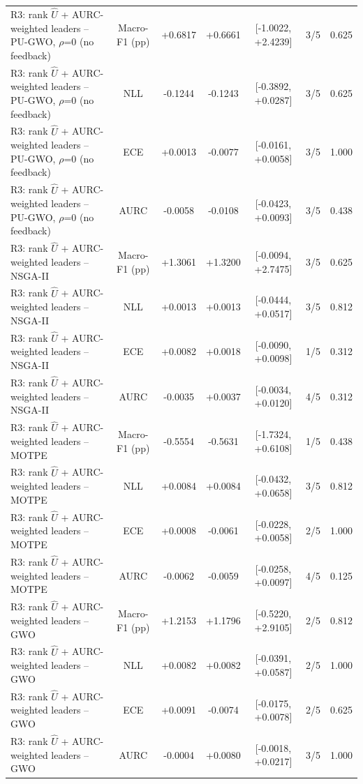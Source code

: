 \begin{table}[t]
\begin{tabular}{lcccccc}
R3: rank $\hat{U}$ + AURC-weighted leaders -- PU-GWO, $\rho$=0 (no feedback) & Macro-F1 (pp) & +0.6817 & +0.6661 & [-1.0022, +2.4239] & 3/5 & 0.625 \\
R3: rank $\hat{U}$ + AURC-weighted leaders -- PU-GWO, $\rho$=0 (no feedback) & NLL & -0.1244 & -0.1243 & [-0.3892, +0.0287] & 3/5 & 0.625 \\
R3: rank $\hat{U}$ + AURC-weighted leaders -- PU-GWO, $\rho$=0 (no feedback) & ECE & +0.0013 & -0.0077 & [-0.0161, +0.0058] & 3/5 & 1.000 \\
R3: rank $\hat{U}$ + AURC-weighted leaders -- PU-GWO, $\rho$=0 (no feedback) & AURC & -0.0058 & -0.0108 & [-0.0423, +0.0093] & 3/5 & 0.438 \\
R3: rank $\hat{U}$ + AURC-weighted leaders -- NSGA-II & Macro-F1 (pp) & +1.3061 & +1.3200 & [-0.0094, +2.7475] & 3/5 & 0.625 \\
R3: rank $\hat{U}$ + AURC-weighted leaders -- NSGA-II & NLL & +0.0013 & +0.0013 & [-0.0444, +0.0517] & 3/5 & 0.812 \\
R3: rank $\hat{U}$ + AURC-weighted leaders -- NSGA-II & ECE & +0.0082 & +0.0018 & [-0.0090, +0.0098] & 1/5 & 0.312 \\
R3: rank $\hat{U}$ + AURC-weighted leaders -- NSGA-II & AURC & -0.0035 & +0.0037 & [-0.0034, +0.0120] & 4/5 & 0.312 \\
R3: rank $\hat{U}$ + AURC-weighted leaders -- MOTPE & Macro-F1 (pp) & -0.5554 & -0.5631 & [-1.7324, +0.6108] & 1/5 & 0.438 \\
R3: rank $\hat{U}$ + AURC-weighted leaders -- MOTPE & NLL & +0.0084 & +0.0084 & [-0.0432, +0.0658] & 3/5 & 0.812 \\
R3: rank $\hat{U}$ + AURC-weighted leaders -- MOTPE & ECE & +0.0008 & -0.0061 & [-0.0228, +0.0058] & 2/5 & 1.000 \\
R3: rank $\hat{U}$ + AURC-weighted leaders -- MOTPE & AURC & -0.0062 & -0.0059 & [-0.0258, +0.0097] & 4/5 & 0.125 \\
R3: rank $\hat{U}$ + AURC-weighted leaders -- GWO & Macro-F1 (pp) & +1.2153 & +1.1796 & [-0.5220, +2.9105] & 2/5 & 0.812 \\
R3: rank $\hat{U}$ + AURC-weighted leaders -- GWO & NLL & +0.0082 & +0.0082 & [-0.0391, +0.0587] & 2/5 & 1.000 \\
R3: rank $\hat{U}$ + AURC-weighted leaders -- GWO & ECE & +0.0091 & -0.0074 & [-0.0175, +0.0078] & 2/5 & 0.625 \\
R3: rank $\hat{U}$ + AURC-weighted leaders -- GWO & AURC & -0.0004 & +0.0080 & [-0.0018, +0.0217] & 3/5 & 1.000 \\

\end{tabular}
\end{table}
